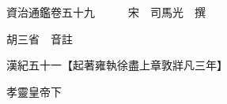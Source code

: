 










 


 
 


 

  
  
  
  
  





  
  
  
  
  
 
  

  

  
  
  



  

 
 

  
   




  

  
  


  　　資治通鑑卷五十九　　　宋　司馬光　撰

　　胡三省　音註

　　漢紀五十一【起著雍執徐盡上章敦牂凡三年】

　　孝靈皇帝下

